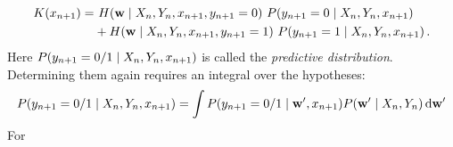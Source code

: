 \begin{align}
	K(x_{n+1}) =&~ H({\bf w} \mid X_n, Y_n, x_{n+1}, y_{n+1} = 0) ~
	{P(y_{n+1} = 0 \mid X_n, Y_n, x_{n+1})} \\
	&+
	H({\bf w} \mid X_n, Y_n, x_{n+1}, y_{n+1} = 1) ~
	{P(y_{n+1} = 1 \mid X_n, Y_n, x_{n+1})} \,.
\end{align}
Here ${P(y_{n+1} = 0/1 \mid X_n, Y_n, x_{n+1})}$ is called the \emph{predictive distribution}. Determining them again requires an integral over the hypotheses:
\begin{align}
	{P(y_{n+1} = 0/1 \mid X_n, Y_n, x_{n+1})}
	= \int {P(y_{n+1} = 0/1 \mid {\bf w}', x_{n+1})} {P({\bf w}' \mid X_n, Y_n)} \,\mathrm{d} {\bf w}'
\end{align}
For 

